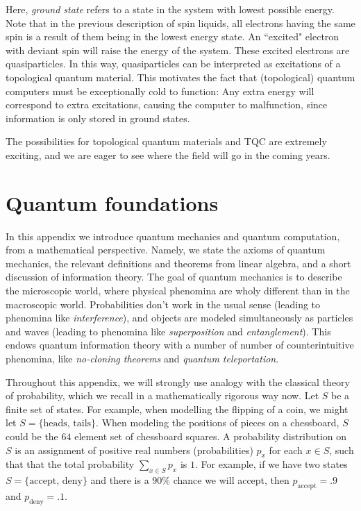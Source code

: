 \documentclass{article}
\theoremstyle{definition}
\numberwithin{figure}{section}
\begin{document}
Here, \textit{ground state} refers to a state in the system with lowest possible energy. Note that in the previous description of spin liquids, all electrons having the same spin is a result of them being in the lowest energy state. An ``excited" electron with deviant spin will raise the energy of the system. These excited electrons are quasiparticles. In this way, quasiparticles can be interpreted as excitations of a topological quantum material. This motivates the fact that (topological) quantum computers must be exceptionally cold to function: Any extra energy will correspond to extra excitations, causing the computer to malfunction, since information is only stored in ground states.

The possibilities for topological quantum materials and TQC are extremely exciting, and we are eager to see where the field will go in the coming years.

\section{Quantum foundations}
\label{Quantum foundations}

In this appendix we introduce quantum mechanics and quantum computation, from a mathematical perspective. Namely, we state the axioms of quantum mechanics, the relevant definitions and theorems from linear algebra, and a short discussion of information theory. The goal of quantum mechanics is to describe the microscopic world, where physical phenomina are wholy different than in the macroscopic world. Probabilities don't work in the usual sense (leading to phenomina like \textit{interference}), and objects are modeled simultaneously as particles and waves (leading to phenomina like \textit{superposition} and \textit{entanglement}). This endows quantum information theory with a number of number of counterintuitive phenomina, like \textit{no-cloning theorems} and \textit{quantum teleportation}.

Throughout this appendix, we will strongly use analogy with the classical theory of probability, which we recall in a mathematically rigorous way now. Let $S$ be a finite set of states. For example, when modelling the flipping of a coin, we might let $S=\{\text{heads},\,\text{tails}\}$. When modeling the positions of pieces on a chessboard, $S$ could be the $64$ element set of chessboard squares. A probability distribution on $S$ is an assignment of positive real numbers (probabilities) $p_x$ for each $x\in S$, such that that the total probability $\sum_{x\in S}p_x$ is $1$. For example, if we have two states $S=\{\text{accept},\,\text{deny}\}$ and there is a $90\%$ chance we will accept, then $p_{\text{accept}}=.9$ and $p_{\text{deny}}=.1$.
\end{document}
